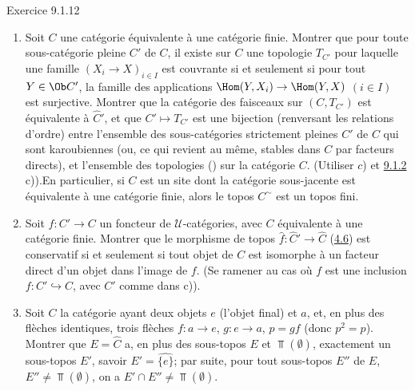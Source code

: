 \documentclass[10pt]{../fichiers-configuration-latex/smfart}
\begin{document}
\begin{enonce*}[remark]{Exercice 9.1.12}
\begin{enumerate}
\item Soit $C$ une catégorie équivalente à une catégorie
finie. Montrer que pour toute sous-catégorie pleine $C'$ de $C$, il
existe sur $C$ une topologie $T_{C'}$ pour laquelle une famille
$(X_i\rightarrow X)_{i\in I}$ est couvrante si et seulement si pour
tout $Y\in \Ob C'$, la famille des applications
$\Hom(Y,X_i)\rightarrow \Hom(Y,X)$ $(i\in I)$ est surjective.
Montrer que la catégorie des faisceaux sur $(C,T_{C'})$ est
équivalente à $\widehat{C}'$, et que $C'\mapsto T_{C'}$ est une
bijection (renversant les relations d'ordre) entre l'ensemble des
sous-catégories strictement pleines $C'$ de $C$ qui sont
karoubiennes (ou, ce qui revient au même, stables dans $C$ par
facteurs directs), et l'ensemble des topologies ()
sur la catégorie $C$. (Utiliser $c$) et \hyperref[IV.rem9.1.2]{9.1.2}
c)).\pageoriginale En particulier, si $C$ est un site dont la
catégorie sous-jacente est équivalente à une catégorie finie, alors
le topos $C^{\sim}$ est un topos fini.

\item Soit $f:C'\rightarrow C$ un foncteur de $𝒰$-catégories, avec
$C$ équivalente à une catégorie finie. Montrer que le morphisme de
topos $\widehat{f}:\widehat{C}'\rightarrow \widehat{C}$
(\hyperref[IV.subsec4.6]{4.6}) est conservatif si et seulement si tout objet
de $C$ est isomorphe à un facteur direct d'un objet dans l'image de
$f$. (Se ramener au cas où $f$ est une inclusion
$f:C'\hookrightarrow C$, avec $C'$ comme dans c)).

\item Soit $C$ la catégorie ayant deux objets $e$ (l'objet final) et
$a$, et, en plus des flèches identiques, trois flèches
$f:a\rightarrow e$, $g:e\rightarrow a$, $p=gf$ (donc $p^2=p$).
Montrer que $E=\widehat{C}$ a, en plus des sous-topos $E$ et
$\Top(∅)$, exactement un sous-topos $E'$, savoir
$E'=\widehat{\{e\}}$; par suite, pour tout sous-topos $E''$ de $E$,
$E''\neq \Top(∅)$, on a $E'\cap E''\neq \Top(∅)$.
\end{enumerate}
\end{enonce*}
\end{document}

